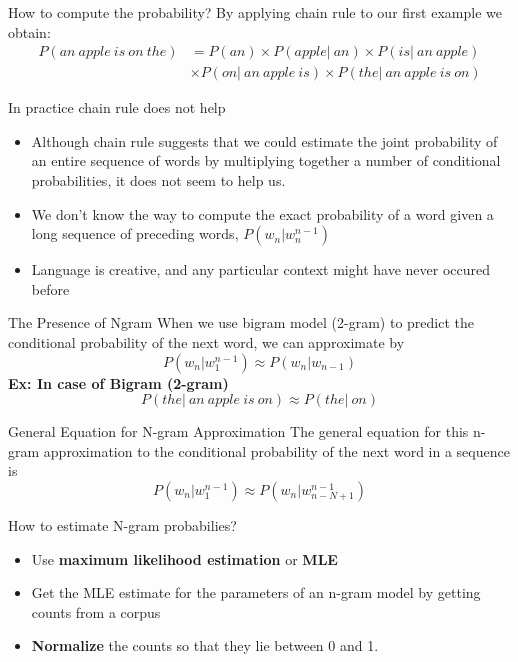 \documentclass{beamer}
\begin{document}
\begin{frame}{How to compute the probability?}
By applying chain rule to our first example we obtain:
    \begin{align*}
        P(an\ apple\ is\ on\ the) &= P(an)\times P(apple|\ an) \times P(is|\ an\ apple)\\
                                  &\times P(on|\ an\ apple\ is) \times P(the|\ an\ apple\ is\ on) 
    \end{align*}
\end{frame}

\begin{frame}{In practice chain rule does not help}
    \begin{itemize}
        \item Although chain rule suggests that we could estimate the joint probability of an entire sequence of words by multiplying together a number of conditional probabilities, it does not seem to help us.
        \item We don't know the way to compute the exact probability of a word given a long sequence of preceding words, $P(w_n|w_n^{n-1})$
        \item Language is creative, and any particular context might have never occured before
    \end{itemize}
\end{frame}

\begin{frame}{The Presence of Ngram}
    When we use bigram model (2-gram) to predict the conditional probability of the next word,
    we can approximate by
    $$P(w_n|w_1^{n-1}) \approx P(w_n|w_{n-1})$$
    \textbf{Ex: In case of Bigram (2-gram)} 
    $$P(the|\ an\ apple\ is\ on) \approx P(the|\ on)$$
\end{frame}


\begin{frame}{General Equation for N-gram Approximation}
    The general equation for this n-gram approximation to the conditional probability of the next word in a sequence is
    $$P(w_n|w_1^{n-1}) \approx P(w_n|w_{n-N+1}^{n-1})$$
\end{frame}
\begin{frame}{How to estimate N-gram probabilies?}
    \begin{itemize}
        \item Use \textbf{maximum likelihood estimation} or \textbf{MLE}
        \item Get the MLE estimate for the parameters of an n-gram model by getting counts from a corpus
        \item \textbf{Normalize} the counts so that they lie between 0 and 1.
    \end{itemize}
\end{frame}
\end{document}
